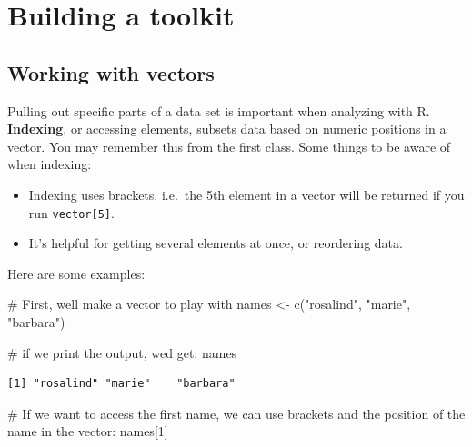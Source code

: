 \documentclass[
  letterpaper,
  DIV=11,
  numbers=noendperiod]{scrreprt}
\newenvironment{Shaded}{\begin{snugshade}}{\end{snugshade}}
\newcommand{\CommentTok}[1]{\textcolor[rgb]{0.37,0.37,0.37}{#1}}
\newcommand{\DecValTok}[1]{\textcolor[rgb]{0.68,0.00,0.00}{#1}}
\newcommand{\FunctionTok}[1]{\textcolor[rgb]{0.28,0.35,0.67}{#1}}
\newcommand{\NormalTok}[1]{\textcolor[rgb]{0.00,0.23,0.31}{#1}}
\newcommand{\OtherTok}[1]{\textcolor[rgb]{0.00,0.23,0.31}{#1}}
\newcommand{\StringTok}[1]{\textcolor[rgb]{0.13,0.47,0.30}{#1}}
\begin{document}
\hypertarget{building-a-toolkit}{%
\section{Building a toolkit}\label{building-a-toolkit}}

\hypertarget{working-with-vectors}{%
\subsection{Working with vectors}\label{working-with-vectors}}

Pulling out specific parts of a data set is important when analyzing
with R. \textbf{Indexing}, or accessing elements, subsets data based on
numeric positions in a vector. You may remember this from the first
class. Some things to be aware of when indexing:

\begin{itemize}
\item
  Indexing uses brackets. i.e.~the 5th element in a vector will be
  returned if you run \texttt{vector{[}5{]}}.
\item
  It's helpful for getting several elements at once, or reordering data.
\end{itemize}

Here are some examples:

\begin{Shaded}
\begin{Highlighting}[]
\CommentTok{\# First, we\textquotesingle{}ll make a vector to play with}
\NormalTok{names }\OtherTok{\textless{}{-}} \FunctionTok{c}\NormalTok{(}\StringTok{"rosalind"}\NormalTok{, }\StringTok{"marie"}\NormalTok{, }\StringTok{"barbara"}\NormalTok{)}
\end{Highlighting}
\end{Shaded}

\begin{Shaded}
\begin{Highlighting}[]
\CommentTok{\# if we print the output, we\textquotesingle{}d get:}
\NormalTok{names}
\end{Highlighting}
\end{Shaded}

\begin{verbatim}
[1] "rosalind" "marie"    "barbara" 
\end{verbatim}

\begin{Shaded}
\begin{Highlighting}[]
\CommentTok{\# If we want to access the first name, we can use brackets and the position of the name in the vector:}
\NormalTok{names[}\DecValTok{1}\NormalTok{]}
\end{Highlighting}
\end{Shaded}
\end{document}
